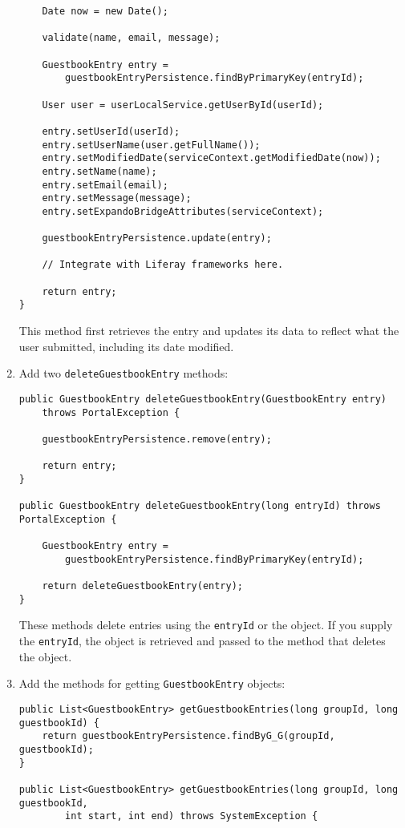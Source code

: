 \begin{enumerate}
\begin{verbatim}
    Date now = new Date();

    validate(name, email, message);

    GuestbookEntry entry =
        guestbookEntryPersistence.findByPrimaryKey(entryId);

    User user = userLocalService.getUserById(userId);

    entry.setUserId(userId);
    entry.setUserName(user.getFullName());
    entry.setModifiedDate(serviceContext.getModifiedDate(now));
    entry.setName(name);
    entry.setEmail(email);
    entry.setMessage(message);
    entry.setExpandoBridgeAttributes(serviceContext);

    guestbookEntryPersistence.update(entry);

    // Integrate with Liferay frameworks here.

    return entry;
}
\end{verbatim}

  This method first retrieves the entry and updates its data to reflect
  what the user submitted, including its date modified.
\item
  Add two \texttt{deleteGuestbookEntry} methods:

\begin{verbatim}
public GuestbookEntry deleteGuestbookEntry(GuestbookEntry entry)
    throws PortalException {

    guestbookEntryPersistence.remove(entry);

    return entry;
}

public GuestbookEntry deleteGuestbookEntry(long entryId) throws PortalException {

    GuestbookEntry entry =
        guestbookEntryPersistence.findByPrimaryKey(entryId);

    return deleteGuestbookEntry(entry);
}
\end{verbatim}

  These methods delete entries using the \texttt{entryId} or the object.
  If you supply the \texttt{entryId}, the object is retrieved and passed
  to the method that deletes the object.
\item
  Add the methods for getting \texttt{GuestbookEntry} objects:

\begin{verbatim}
public List<GuestbookEntry> getGuestbookEntries(long groupId, long guestbookId) {
    return guestbookEntryPersistence.findByG_G(groupId, guestbookId);
}

public List<GuestbookEntry> getGuestbookEntries(long groupId, long guestbookId,
        int start, int end) throws SystemException {


\end{verbatim}
\end{enumerate}
